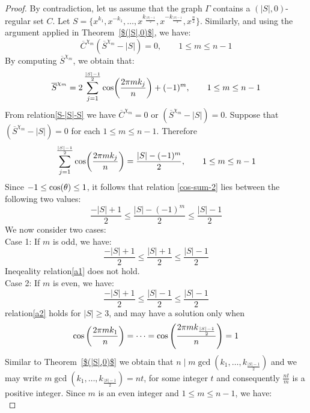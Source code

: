 \documentclass[12pt]{article}
\def\cos{{\rm{cos}}}
\begin{document}
    \begin{proof}
    By contradiction, let us assume that the graph $\Gamma$ contains a $(|S|,0)$-regular set $C$. Let  $S = \{x^{k_1}, x^{-k_1}, \dots, x^{k_{\frac{|S|-1}{2}}}, x^{-k_{\frac{|S|-1}{2}}},x^{\frac{n}{2}}\}$. Similarly, and using the argument applied in Theorem~\ref{$(|S|,0)$}, we have:	
    \begin{equation}\label{S-|S|-S}
    	\overline{C}^{\chi_m} (\overline{S}^{\chi_m}-|S|)= 0, \qquad 1 \le m \le n-1
    \end{equation}
    By computing $\overline{S}^{\chi_m}$, we obtain that:
    \[
    \overline{S}^{\chi_m} = 2	\sum_{j=1}^{\frac{|S|-1}{2}}
    \cos\!\left(\frac{2\pi m k_j}{n}\right) + (-1)^m,
    \qquad 1 \le m \le n-1
    \]
    From relation\eqref{S-|S|-S} we have $\overline{C}^{\chi_m} = 0$ or  $(\overline{S}^{\chi_m}-|S|) = 0$. Suppose that   $(\overline{S}^{\chi_m}-|S|) = 0$ for each  $1 \le m \le n-1$. Therefore
    \begin{equation}\label{cos-sum-2}
     \sum_{j=1}^{\frac{|S|-1}{2}}
    	\cos\!\left(\frac{2\pi m k_j}{n}\right)
    	= \frac{|S|-(-1)^m}{2},
    	\qquad 1 \le m\le n-1
    \end{equation}	
    Since $ -1 \le \cos(\theta) \le 1$, it follows that relation \eqref{cos-sum-2} lies between the following two values:
    \[
    \frac{-|S|+1}{2} \le \frac{|S|-(-1)^m}{2} \le \frac{|S|-1}{2}
    \]
    We now consider two cases:\\
    Case 1: If $m$ is odd, we have:
    \begin{equation}\label{a1}
    	\frac{-|S|+1}{2} \le \frac{|S|+1}{2} \le \frac{|S|-1}{2}	
    \end{equation}
    Ineqeality relation\eqref{a1} does not hold.\\
    Case 2: If $m$ is even, we have:
    \begin{equation}\label{a2}
    	\frac{-|S|+1}{2} \le \frac{|S|-1}{2} \le \frac{|S|-1}{2}	
    \end{equation}
    relation\eqref{a2} holds for $|S|\geq3 $, and may have a solution only when
    \[
    \cos\left(\frac{2\pi m k_1}{n}\right) = \dots = \cos\left(\frac{2\pi m  k_{\frac{|S|-1}{2}}}{n}\right) = 1
    \]
    Similar to  Theorem~\ref{$(|S|,0)$} we obtain that
     $ n \mid m  \gcd(k_1,\dots, k_{\frac{|S|-1}{2}})$ and we may write $m \gcd(k_1,\dots, k_{\frac{|S|-1}{2}}) = nt$, for some integer $t$ and consequently $\frac{nt}{m}$ is a positive integer. Since $m$ is an even integer and $1 \le m \le n-1$, we have:
     \begin{equation}\label{eq:gcd}

\end{equation}
\end{proof}
\end{document}
